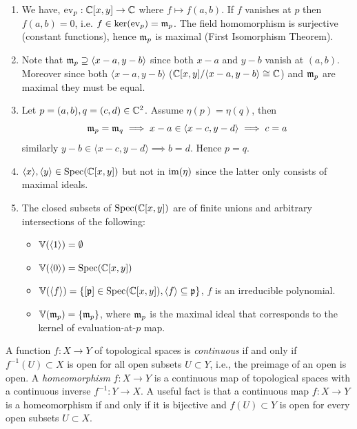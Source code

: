 \documentclass[Notebook.tex]{subfiles}
\begin{document}
\begin{solution}
    \bbni 
    \begin{enumerate}[label=(\alph*),ref=\theenumi\alph*]
        \item We have, $\operatorname{ev}_p: \mathbb C[x,y] \to \mathbb C$ where $f \mapsto f(a,b)$. If $f$ vanishes at $p$ then $f(a,b) = 0$, i.e. $f \in \ker(\operatorname{ev}_p) = \operatorname{\mathfrak{m}}_p$. The field homomorphism is surjective (constant functions), hence $\operatorname{\mathfrak{m}}_p$ is maximal (First Isomorphism Theorem). 
        
        \item Note that $\operatorname{\mathfrak{m}}_p \supseteq \langle x -a, y -b \rangle$ since both $x-a$ and $y-b$ vanish at $(a,b)$. Moreover since both $\langle x -a, y -b \rangle$ ($\mathbb C[x,y]/\langle x -a, y -b \rangle \cong \mathbb C$) and $\operatorname{\mathfrak{m}}_p$ are maximal they must be equal. 
        
        \item Let $p = (a,b), q = (c,d) \in \mathbb C^2$. Assume $\eta(p) = \eta(q)$, then 
        \[\operatorname{\mathfrak{m}}_p = \operatorname{\mathfrak{m}}_q \implies x - a \in \langle x -c, y -d \rangle \implies c = a\] 
        similarly $y - b \in \langle x -c, y -d \rangle \implies b  = d$. Hence $p = q$. 

        \item $\langle x \rangle, \langle y \rangle \in \operatorname{Spec}(\mathbb C[x,y])$ but not in $\operatorname{im}(\eta)$ since the latter only consists of maximal ideals. 
        
        \item The closed subsets of $\operatorname{Spec}(\mathbb C[x,y])$ are of finite unions and arbitrary intersections of the following: 
        \begin{itemize}
            \item $\mathbb V(\langle 1 \rangle) = \emptyset$
            \item $\mathbb V(\langle 0 \rangle) = \operatorname{Spec}(\mathbb C[x,y])$
            \item $\mathbb V(\langle f \rangle) = \{[\operatorname{\mathfrak{p}}] \in \operatorname{Spec}(\mathbb C[x,y]), \langle f \rangle \subseteq \operatorname{\mathfrak{p}}\}$, $f$ is an irreducible polynomial. 
            \item $\mathbb V(\operatorname{\mathfrak{m}}_p) = \{\operatorname{\mathfrak{m}}_p\}$, where $\operatorname{\mathfrak{m}}_p$ is the maximal ideal that corresponds to the kernel of evaluation-at-$p$ map. 
        \end{itemize}
    \end{enumerate}
\end{solution}

\hrulefill

A function $f: X \to Y$ of topological spaces is \emph{continuous} if and only if $f^{-1}(U) \subset X$ is open for all open subsets $U \subset Y$, i.e., the preimage of an open is open. A \emph{homeomorphism} $f: X \to Y$ is a continuous map of topological spaces with a continuous inverse $f^{-1}:Y \to X$. A useful fact is that a continuous map $f:X \to Y$ is a homeomorphism if and only if it is bijective and $f(U) \subset Y$ is open for every open subsets $U \subset X$. 
 
\end{document}
